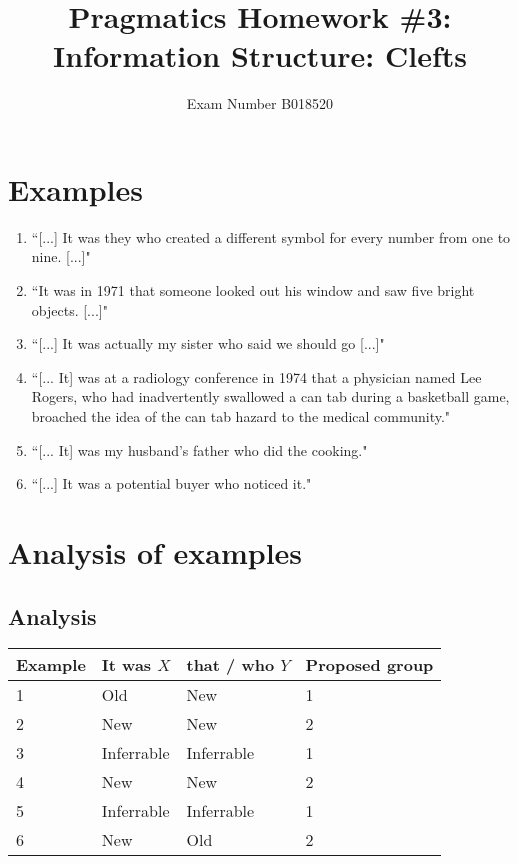 \documentclass[12pt,a4paper]{article}
\begin{document}
\title{Pragmatics Homework \#3: Information Structure: Clefts}
\author{Exam Number B018520}

\maketitle

\section{Examples}

\begin{enumerate}

\item ``[...] It was they who created a different symbol for every number from one to nine. [...]"

\item ``It was in 1971 that someone looked out his window and saw five bright objects. [...]"

\item ``[...] It was actually my sister who said we should go [...]"

\item ``[... It] was at a radiology conference in 1974 that a physician named Lee Rogers, who had inadvertently swallowed a can tab during a basketball game, broached the idea of the can tab hazard to the medical community."

\item ``[... It] was my husband's father who did the cooking."

\item ``[...] It was a potential buyer who noticed it."

\end{enumerate}

\section{Analysis of examples}
\subsection{Analysis}
\begin{tabular}{ l | l | l | l }
Example & It was $X$ & that / who $Y$ & Proposed group \\
\hline
1 & Old        & New        & 1 \\
2 & New        & New        & 2 \\
3 & Inferrable & Inferrable & 1 \\
4 & New        & New        & 2 \\
5 & Inferrable & Inferrable & 1 \\
6 & New        & Old        & 2 \\  
\end{tabular}
\end{document}
